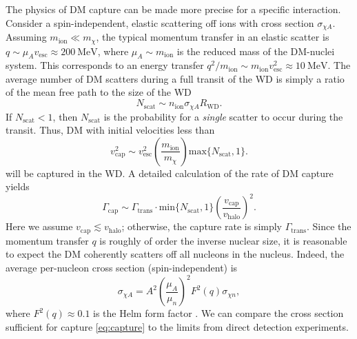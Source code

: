 \documentclass[preprintnumbers,amsmath,amssymb,prd,superscriptaddress]{revtex4}
\newcommand{\Eboom}{\mathcal{E}_\text{boom}}
\newcommand{\MeV}{\text{MeV}}
\newcommand{\cm}{\text{cm}}
\def\r{\right)}
\def\l{\left(}
\begin{document}
The physics of DM capture can be made more precise for a specific interaction.
Consider a spin-independent, elastic scattering off ions with cross section $\sigma_{\chi A}$. 
Assuming $m_\text{ion} \ll m_\chi$, the typical momentum transfer in an elastic scatter is $q \sim \mu_{A} v_\text{esc} \approx 200 ~\MeV$, where $\mu_{A} \sim m_\text{ion}$ is the reduced mass of the DM-nuclei system. 
This corresponds to an energy transfer $q^2/m_\text{ion} \sim m_\text{ion} v_\text{esc}^2 \approx 10 ~\MeV$. 
The average number of DM scatters during a full transit of the WD is simply a ratio of the mean free path to the size of the WD
\begin{equation}
N_\text{scat} \sim n_\text{ion} \sigma_{\chi A} R_\text{WD}.
\end{equation}
If $N_\text{scat} < 1$, then $N_\text{scat}$ is the probability for a \emph{single} scatter to occur during the transit. 
Thus, DM with initial velocities less than
\begin{equation}
\label{eq:capture}
v_\text{cap}^2 \sim v_\text{esc}^2 \l \frac{m_\text{ion}}{m_\chi} \r \text{max}\{N_\text{scat} ,1\}.
\end{equation}
will be captured in the WD. 
A detailed calculation of the rate of DM capture \cite{Gould} yields  
\begin{equation}
\Gamma_\text{cap} \sim \Gamma_\text{trans} \cdot \text{min}\{N_\text{scat}, 1\} \l \frac{v_\text{cap}}{v_\text{halo}} \r^2.
\end{equation}
Here we assume $v_\text{cap} \lesssim v_\text{halo}$; otherwise, the capture rate is simply $\Gamma_\text{trans}$. 
Since the momentum transfer $q$ is roughly of order the inverse nuclear size, it is reasonable to expect the DM coherently scatters off all nucleons in the nucleus. 
Indeed, the average per-nucleon cross section (spin-independent) is
\begin{equation}
\sigma_{\chi A} = A^2 \l \frac{\mu_{A}}{\mu_{n}}\r^2 F^2(q) \sigma_{\chi n},
\end{equation}
where $F^2(q) \approx 0.1$ is the Helm form factor \cite{LUX thesis}.  
We can compare the cross section sufficient for capture \eqref{eq:capture} to the limits from direct detection experiments.
\end{document}
